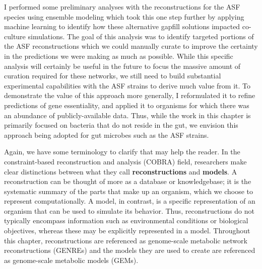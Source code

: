 \documentclass[11pt,twocolumn,notitlepage,openany,twoside]{book}
\begin{document}
\begin{refsection}
I performed some preliminary analyses with the reconstructions for the ASF species using ensemble modeling which took this one step further by applying machine learning to identify how these alternative gapfill solutions impacted co-culture simulations. The goal of this analysis was to identify targeted portions of the ASF reconstructions which we could manually curate to improve the certainty in the predictions we were making as much as possible. While this specific analysis will certainly be useful in the future to focus the massive amount of curation required for these networks, we still need to build substantial experimental capabilities with the ASF strains to derive much value from it. To demonstrate the value of this approach more generally, I reformulated it to refine predictions of gene essentiality, and applied it to organisms for which there was an abundance of publicly-available data. Thus, while the work in this chapter is primarily focused on bacteria that do not reside in the gut, we envision this approach being adopted for gut microbes such as the ASF strains.

Again, we have some terminology to clarify that may help the reader. In the constraint-based reconstruction and analysis (COBRA) field, researchers make clear distinctions between what they call \textbf{reconstructions} and \textbf{models}. A reconstruction can be thought of more as a database or knowledgebase; it is the systematic summary of the parts that make up an organism, which we choose to represent computationally. A model, in contrast, is a specific representation of an organism that can be used to simulate its behavior. Thus, reconstructions do not typically encompass information such as environmental conditions or biological objectives, whereas these may be explicitly represented in a model. Throughout this chapter, reconstructions are referenced as genome-scale metabolic network reconstructions (GENREs) and the models they are used to create are referenced as genome-scale metabolic models (GEMs).


\end{refsection}
\end{document}
